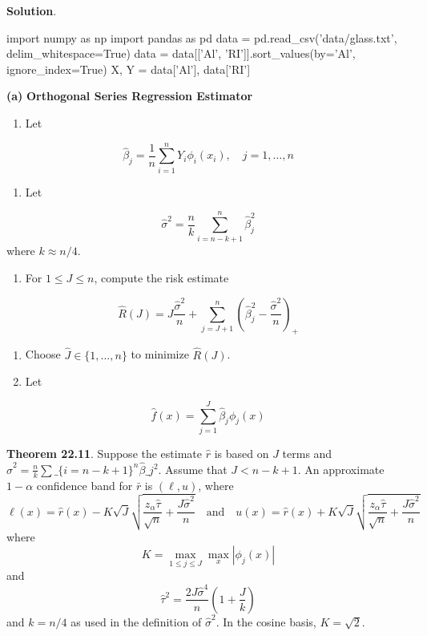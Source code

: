 \textbf{Solution}.

\begin{python}
import numpy as np
import pandas as pd
data = pd.read_csv('data/glass.txt', delim_whitespace=True)
data = data[['Al', 'RI']].sort_values(by='Al', ignore_{i}ndex=True)
X, Y = data['Al'], data['RI']
\end{python}
\textbf{(a)}
\textbf{Orthogonal Series Regression Estimator}
\begin{enumerate}[tightlist,label={\arabic*.}]
\item
  Let
\end{enumerate}
\[
\hat{\beta}_{j} = \frac{1}{n} \sum_{i=1}^{n} Y_{i} \phi_{i}(x_{i}), \quad j = 1, \dots, n
\]
\begin{enumerate}[tightlist,label={\arabic*.}]
\item
  Let
\end{enumerate}
\[
\hat{\sigma}^{2} = \frac{n}{k} \sum_{i=n-k+1}^{n} \hat{\beta}_{j}^{2}
\]
where \(k \approx n / 4\).
\begin{enumerate}[tightlist,label={\arabic*.},resume]
\item
  For \(1 \leq J \leq n\), compute the risk estimate
\end{enumerate}
\[
\hat{R}(J) = J \frac{\hat{\sigma}^{2}}{n} + \sum_{j=J+1}^{n} \left(\hat{\beta}_{j}^{2} - \frac{\hat{\sigma}^{2}}{n} \right)_{+}
\]
\begin{enumerate}
\def\labelenumi{\arabic{enumi}.}
\setcounter{enumi}{3}
\item
  Choose \(\hat{J} \in \{1, \dots, n \}\) to minimize \(\hat{R}(J)\).
\item
  Let
\end{enumerate}
\[
\hat{f}(x) = \sum_{j=1}^J \hat{\beta}_{j} \phi_{j}(x)
\]

\textbf{Theorem 22.11}. Suppose the estimate \(\hat{r}\) is based on
\(J\) terms and $\hat{\sigma}^{2} = \frac{n}{k} \sum\_\{i=n-k+1\}^{n}
\hat{\beta}\_{j}^{2} $. Assume that \(J < n - k + 1\). An approximate
\(1 - \alpha\) confidence band for \(\bar{r}\) is \((\ell, u)\),
where
\[
\ell(x) = \hat{r}(x) - K \sqrt{J} \sqrt{\frac{z_{\alpha} \hat{\tau}}{\sqrt{n}} + \frac{J \hat{\sigma}^{2}}{n}}
\quad \text{and} \quad u(x) = \hat{r}(x) + K \sqrt{J} \sqrt{\frac{z_{\alpha} \hat{\tau}}{\sqrt{n}} + \frac{J \hat{\sigma}^{2}}{n}}
\]
where
\[
K = \max_{1 \leq j \leq J} \max_x | \phi_{j}(x) |
\]
and
\[
\hat{\tau}^{2} = \frac{2 J \hat{\sigma}^{4}}{n} \left( 1 + \frac{J}{k} \right)
\]
and \(k = n / 4\) as used in the definition of \(\hat{\sigma}^{2}\). In
the cosine basis, \(K = \sqrt{2}\).

